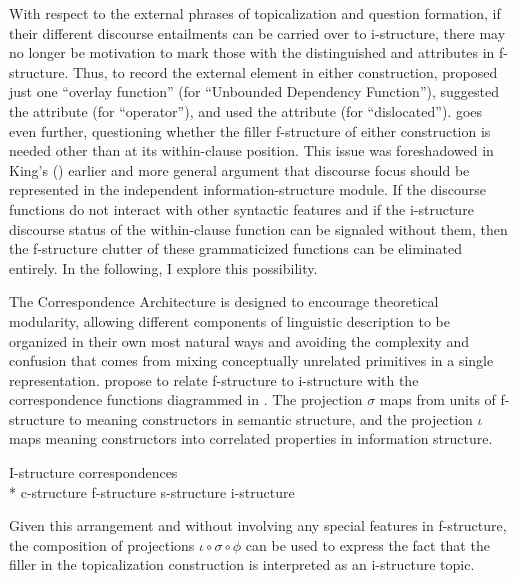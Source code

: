 \documentclass[output=paper,hidelinks]{langscibook}
\begin{document}
 With respect to the external phrases of topicalization and question formation, if their different discourse entailments can be carried over to i-structure, there may no longer be motivation to mark those with the distinguished \TOPIC and \FOCUS attributes in f-structure.  Thus, to record the external element in either construction, \citet{Asudeh2004,Asudeh12} proposed just one ``overlay function''   (for ``Unbounded Dependency Function''), \citet{alsina2008} suggested the attribute  (for ``operator''), and \citet{DLM:LFG} used the attribute  (for ``dislocated''). \citet{Snijders2015} goes even further, questioning whether the filler f-structure of either construction is needed other than at its within-clause position.  This issue was foreshadowed in King's (\citeyear{King1997}) earlier and more general argument that discourse focus should be represented in the independent information-structure module.  If the discourse functions do not interact with other syntactic features and if the i-structure discourse status of the within-clause function can be signaled without them, then the f-structure clutter of these grammaticized functions can be eliminated entirely. In the following, I explore this possibility.
  
The Correspondence Architecture is designed to encourage theoretical modularity, allowing different components of linguistic description to be organized in their own most natural ways and avoiding the complexity and confusion that comes from mixing conceptually unrelated primitives in a single representation.  \citet{DN} propose to relate f-structure to i-structure with the correspondence functions diagrammed in  \citep[see also][]{DLM:LFG}. The projection $\sigma$ maps from units of f-structure to meaning constructors in semantic structure, and the projection $\iota$ maps meaning constructors into correlated properties in information structure. 

\ea\label{projections}I-structure correspondences \citep[from][]{DN}\\*  %
\vspace{.75em}\hsp{1em}
c-structure
\hsp{3em}
f-structure
 \hsp{3em}
s-structure
\hsp{3em}
i-structure
\naput{$_\phi$}
\naput{\small$\sigma$}
\naput{\small$\iota$}
\z

\noindent  Given this arrangement and without involving any special features in f-structure, the composition of projections $\iota\circ\sigma\circ\phi$ can be used to express the fact that the filler in the topicalization construction is interpreted as an i-structure topic.
\end{document}
